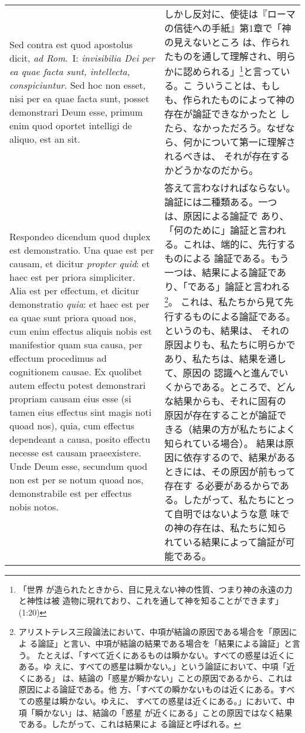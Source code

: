 \documentclass[10pt]{jsarticle} %
\begin{document}
\begin{longtable}{p{21em}p{21em}}
\\



{\sc Sed contra est} quod apostolus dicit, {\it ad Rom}.~I: {\it
 invisibilia Dei per ea quae facta sunt, intellecta, conspiciuntur}. Sed
 hoc non esset, nisi per ea quae facta sunt, posset demonstrari Deum
 esse, primum enim quod oportet intelligi de aliquo, est an sit.

&
しかし反対に、使徒は『ローマの信徒への手紙』第1章で「神の見えないところ
 は、作られたものを通して理解され、明らかに認められる」\footnote{「世界
 が造られたときから、目に見えない神の性質、つまり神の永遠の力と神性は被
 造物に現れており、これを通して神を知ることができます」(1:20)}と言っている。こ
 ういうことは、もしも、作られたものによって神の存在が論証できなかったと
 したら、なかっただろう。なぜなら、何かについて第一に理解されるべきは、
 それが存在するかどうかなのだから。


\\



{\sc Respondeo dicendum} quod duplex est demonstratio. Una quae est per
 causam, et dicitur {\it propter quid}: et haec est per priora
 simpliciter. Alia est per effectum, et dicitur demonstratio {\it quia}:
 et haec est per ea quae sunt priora quoad nos, cum enim effectus
 aliquis nobis est manifestior quam sua causa, per effectum procedimus
 ad cognitionem causae. Ex quolibet autem effectu potest demonstrari
 propriam causam eius esse (si tamen eius effectus sint magis noti quoad
 nos), quia, cum effectus dependeant a causa, posito effectu necesse est
 causam praeexistere. Unde Deum esse, secundum quod non est per se notum
 quoad nos, demonstrabile est per effectus nobis notos.

&
答えて言わなければならない。論証には二種類ある。一つは、原因による論証で
 あり、「何のために」論証と言われる。これは、端的に、先行するものによる
 論証である。もう一つは、結果による論証であり、「である」論証と言われる
 \footnote
{アリストテレス三段論法において、中項が結論の原因である場合を「原因によ
 る論証」と言い、中項が結論の結果である場合を「結果による論証」と言う。
たとえば、「すべて近くにあるものは瞬かない。すべての惑星は近くにある。ゆ
 えに、すべての惑星は瞬かない。」という論証において、中項「近くにある」
 は、結論の「惑星が瞬かない」ことの原因であるから、これは原因による論証である。他
 方、「すべての瞬かないものは近くにある。すべての惑星は瞬かない。ゆえに、
 すべての惑星は近くにある。」において、中項「瞬かない」は、結論の「惑星
 が近くにある」ことの原因ではなく結果である。したがって、これは結果によ
 る論証と呼ばれる。
}。
 これは、私たちから見て先行するものによる論証である。というのも、結果は、
 それの原因よりも、私たちに明らかであり、私たちは、結果を通して、原因の
 認識へと進んでいくからである。ところで、どんな結果からも、それに固有の
 原因が存在することが論証できる（結果の方が私たちによく知られている場合）。
 結果は原因に依存するので、結果があるときには、その原因が前もって存在す
 る必要があるからである。したがって、私たちにとって自明ではないような意
 味での神の存在は、私たちに知られている結果によって論証が可能である。


\end{longtable}
\end{document}
